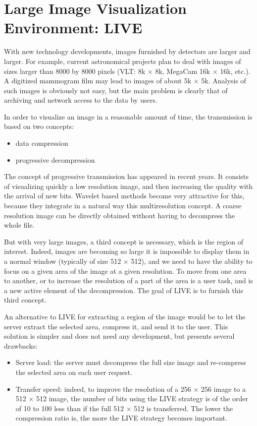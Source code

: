 
\section{Large Image Visualization Environment: LIVE}

With new technology developments, images furnished by detectors are larger
and larger. For example, current astronomical projects plan to deal with images
of sizes larger than 8000 by 8000 pixels (VLT: 8k $\times$ 8k, MegaCam 
16k $\times$ 16k, etc.). A digitized mammogram film may lead to images
of about 5k $\times$ 5k.
Analysis of such images is obviously not easy, but the main problem is clearly
that of archiving and  network access to the data by users. 

In order to visualize an image in a reasonable amount of time, the transmission
is based on two concepts:
\begin{itemize}
\item data compression
\item progressive decompression
\end{itemize}
The concept of progressive transmission has appeared in recent years. It 
consists 
of visualizing quickly a low resolution image, and then  
increasing the quality 
with the arrival of new bits. Wavelet based methods become very attractive
for this, 
because they integrate in a natural way this multiresolution concept. A coarse 
resolution image can be directly obtained without 
having to decompress the whole file.

But with very large images, a third concept is necessary, which is 
the region of 
interest. Indeed, images are becoming so large it is impossible to 
display them in a 
normal window (typically of size 512 $\times$ 512), and we need to 
have the ability to
focus on a given area of the image at a given resolution. To move from one 
area to another, or to increase the resolution of a part of the area is a 
user task, and is a new active element of the decompression. The goal of LIVE 
is to furnish this third concept.

An alternative to LIVE for extracting a region of the image would be to 
let the server extract the selected area, compress it, and send it to the user. 
This solution is simpler and does not need any development, but presents 
several drawbacks:
\begin{itemize}
\item Server load: the server must decompress the full size image and 
re-compress the selected area on each user request.
\item Transfer speed: indeed, to improve the resolution of a 
256 $\times$ 256 image to 
a 512 $\times$
512 image, the number of bits using the LIVE strategy is of the order of 10 
to 100 less than if the full 512 $\times$ 512 is transferred. The 
lower the compression ratio is, the more the LIVE strategy becomes important.
\end{itemize}

